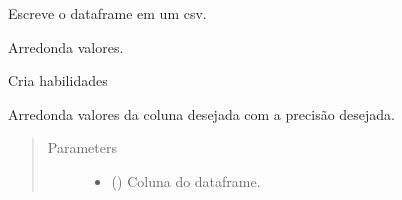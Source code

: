 \documentclass[letterpaper,10pt,brazil]{sphinxmanual}
\begin{document}
\begin{fulllineitems}
\begin{fulllineitems}
\end{fulllineitems}


\begin{fulllineitems}
\label{\detokenize{classe_Fifa_limp:classe_Fifa_limp.Fifa_limp.escrever_csv}}
Escreve o dataframe em um csv.

\end{fulllineitems}


\begin{fulllineitems}
\label{\detokenize{classe_Fifa_limp:classe_Fifa_limp.Fifa_limp.arredondar_valores}}
Arredonda valores.

\end{fulllineitems}


\begin{fulllineitems}
\label{\detokenize{classe_Fifa_limp:classe_Fifa_limp.Fifa_limp.cria_skills}}
Cria habilidades

\end{fulllineitems}


\begin{fulllineitems}
\label{\detokenize{classe_Fifa_limp:id0}}
Arredonda valores da coluna desejada com a precisão desejada.
\begin{quote}\begin{description}
\item[{Parameters}] \leavevmode\begin{itemize}
\item {} 
 () \textendash{} Coluna do dataframe.


\end{itemize}
\end{description}
\end{quote}
\end{fulllineitems}
\end{fulllineitems}
\end{document}
